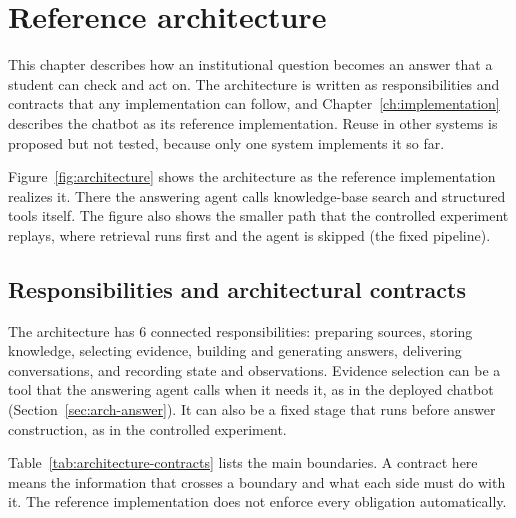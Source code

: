 \section{Reference architecture}
\label{ch:architecture}

This chapter describes how an institutional question becomes an answer that a student can check and act on. The architecture is written as responsibilities and contracts that any implementation can follow, and Chapter~\ref{ch:implementation} describes the chatbot as its reference implementation. Reuse in other systems is proposed but not tested, because only one system implements it so far.

Figure~\ref{fig:architecture} shows the architecture as the reference implementation realizes it. There the answering agent calls knowledge-base search and structured tools itself. The figure also shows the smaller path that the controlled experiment replays, where retrieval runs first and the agent is skipped (the fixed pipeline).



\subsection{Responsibilities and architectural contracts}

The architecture has 6 connected responsibilities: preparing sources, storing knowledge, selecting evidence, building and generating answers, delivering conversations, and recording state and observations. Evidence selection can be a tool that the answering agent calls when it needs it, as in the deployed chatbot (Section~\ref{sec:arch-answer}). It can also be a fixed stage that runs before answer construction, as in the controlled experiment.

Table~\ref{tab:architecture-contracts} lists the main boundaries. A contract here means the information that crosses a boundary and what each side must do with it. The reference implementation does not enforce every obligation automatically.

